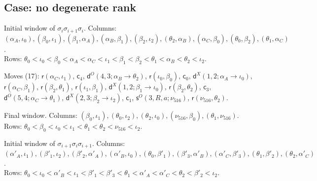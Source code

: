 \documentclass[11pt]{amsart}
\theoremstyle{definition}
\theoremstyle{remark}
\begin{document}
\subsection*{Case: no degenerate rank}
\noindent Initial window of $\sigma_i\sigma_{i+1}\sigma_i$. Columns: $(\alpha_A,\iota_0),\allowbreak (\beta_0,\iota_1),\allowbreak (\beta_1,\alpha_A),\allowbreak (\alpha_B,\beta_1),\allowbreak (\beta_2,\iota_2),\allowbreak (\theta_2,\alpha_B),\allowbreak (\alpha_C,\beta_0),\allowbreak (\theta_0,\beta_2),\allowbreak (\theta_1,\alpha_C)$.\\ Rows: $\theta_0 <\allowbreak \iota_0 <\allowbreak \beta_0 <\allowbreak \alpha_A <\allowbreak \alpha_C <\allowbreak \iota_1 <\allowbreak \beta_1 <\allowbreak \beta_2 <\allowbreak \theta_1 <\allowbreak \alpha_B <\allowbreak \theta_2 <\allowbreak \iota_2$.\par
\noindent Moves (17): $\mathsf{r}(\alpha_C,\iota_1)$, $\mathsf{c}_{4}$, $\mathsf{d}^{O}(4,3;\alpha_B\to\theta_2)$, $\mathsf{r}(\iota_0,\beta_0)$, $\mathsf{c}_{0}$, $\mathsf{d}^{X}(1,2;\alpha_A\to\iota_0)$, $\mathsf{r}(\alpha_C,\beta_1)$, $\mathsf{r}(\beta_2,\theta_1)$, $\mathsf{r}(\iota_1,\beta_1)$, $\mathsf{d}^{X}(1,2;\beta_1\to\iota_0)$, $\mathsf{r}(\beta_2,\theta_2)$, $\mathsf{c}_{3}$, $\mathsf{d}^{O}(5,4;\alpha_C\to\theta_1)$, $\mathsf{d}^{X}(2,3;\beta_2\to\iota_2)$, $\mathsf{c}_{1}$, $\mathsf{s}^{O}(3,R,a;\nu_{516})$, $\mathsf{r}(\nu_{516},\theta_2)$.\par
\noindent Final window. Columns: $(\beta_0,\iota_1),\allowbreak (\theta_0,\iota_2),\allowbreak (\theta_2,\iota_0),\allowbreak (\nu_{516},\beta_0),\allowbreak (\theta_1,\nu_{516})$.\\ Rows: $\theta_0 <\allowbreak \beta_0 <\allowbreak \iota_0 <\allowbreak \iota_1 <\allowbreak \theta_1 <\allowbreak \theta_2 <\allowbreak \nu_{516} <\allowbreak \iota_2$.\par\medskip
\noindent Initial window of $\sigma_{i+1}\sigma_i\sigma_{i+1}$. Columns: $(\alpha'_A,\iota_1),\allowbreak (\beta'_1,\iota_2),\allowbreak (\beta'_2,\alpha'_A),\allowbreak (\alpha'_B,\iota_0),\allowbreak (\theta_0,\beta'_1),\allowbreak (\beta'_3,\alpha'_B),\allowbreak (\alpha'_C,\beta'_3),\allowbreak (\theta_1,\beta'_2),\allowbreak (\theta_2,\alpha'_C)$.\\ Rows: $\theta_0 <\allowbreak \iota_0 <\allowbreak \alpha'_B <\allowbreak \iota_1 <\allowbreak \beta'_1 <\allowbreak \beta'_3 <\allowbreak \theta_1 <\allowbreak \alpha'_A <\allowbreak \alpha'_C <\allowbreak \theta_2 <\allowbreak \beta'_2 <\allowbreak \iota_2$.\par
\end{document}
